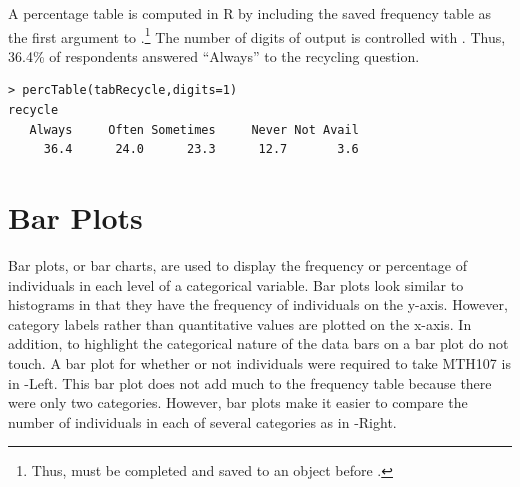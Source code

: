 \documentclass[10pt,openany]{book}\usepackage[]{graphicx}\usepackage[]{color}
\makeatletter
\newenvironment{kframe}{%
 \def\at@end@of@kframe{}%
 \ifinner\ifhmode%
  \def\at@end@of@kframe{\end{minipage}}%
  \begin{minipage}{\columnwidth}%
 \fi\fi%
 \def\FrameCommand##1{\hskip\@totalleftmargin \hskip-\fboxsep
 \colorbox{shadecolor}{##1}\hskip-\fboxsep
     \hskip-\linewidth \hskip-\@totalleftmargin \hskip\columnwidth}%
 \MakeFramed {\advance\hsize-\width
   \@totalleftmargin\z@ \linewidth\hsize
   \@setminipage}}%
 {\par\unskip\endMakeFramed%
 \at@end@of@kframe}
\newenvironment{knitrout}{}{} %
\makeatother
\begin{document}
A percentage table is computed in R by including the saved frequency table as the first argument to .\footnote{Thus,  must be completed and saved to an object before .}  The number of digits of output is controlled with . Thus, 36.4\% of respondents answered ``Always'' to the recycling question.
\begin{knitrout}
\color{fgcolor}\begin{kframe}
\begin{verbatim}
> percTable(tabRecycle,digits=1)
recycle
   Always     Often Sometimes     Never Not Avail 
     36.4      24.0      23.3      12.7       3.6 
\end{verbatim}
\end{kframe}
\end{knitrout}

\section{Bar Plots}
Bar plots, or bar charts, are used to display the frequency or percentage of individuals in each level of a categorical variable.  Bar plots look similar to histograms in that they have the frequency of individuals on the y-axis.  However, category labels rather than quantitative values are plotted on the x-axis.  In addition, to highlight the categorical nature of the data bars on a bar plot do not touch.  A bar plot for whether or not individuals were required to take MTH107 is in -Left.  This bar plot does not add much to the frequency table because there were only two categories.  However, bar plots make it easier to compare the number of individuals in each of several categories as in -Right.
\end{document}

